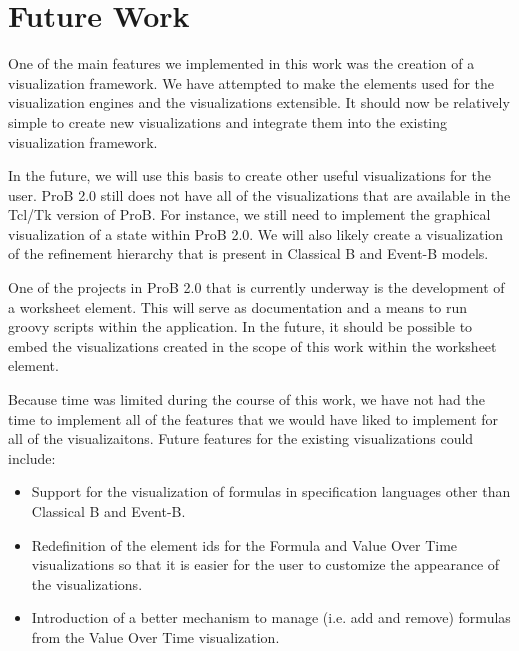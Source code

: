 \section{Future Work}

One of the main features we implemented in this work was the creation of a visualization framework. We have attempted to make the elements used for the visualization engines and the visualizations extensible. It should now be relatively simple to create new visualizations and integrate them into the existing visualization framework.

In the future, we will use this basis to create other useful visualizations for the user. ProB 2.0 still does not have all of the visualizations that are available in the Tcl/Tk version of ProB. For instance, we still need to implement the graphical visualization of a state within ProB 2.0. We will also likely create a visualization of the refinement hierarchy that is present in Classical B and Event-B models.

One of the projects in ProB 2.0 that is currently underway is the development of a worksheet element. This will serve as documentation and a means to run groovy scripts within the application. In the future, it should be possible to embed the visualizations created in the scope of this work within the worksheet element. 

Because time was limited during the course of this work, we have not had the time to implement all of the features that we would have liked to implement for all of the visualizaitons. Future features for the existing visualizations could include:

\begin{itemize}

	\item Support for the visualization of formulas in specification languages other than Classical B and Event-B.
	\item Redefinition of the element ids for the Formula and Value Over Time visualizations so that it is easier for the user to customize the appearance of the visualizations.
	\item Introduction of a better mechanism to manage (i.e. add and remove) formulas from the Value Over Time visualization.

\end{itemize}